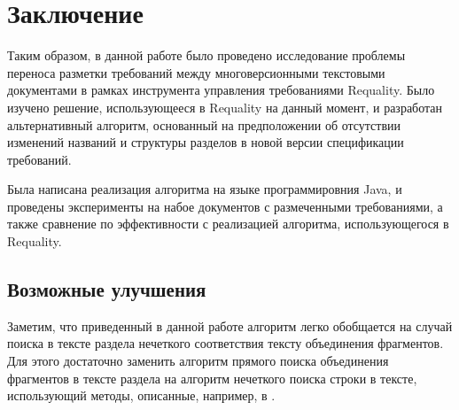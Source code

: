 \section{Заключение}
\label{sec:Chapter6} 

Таким образом, в данной работе было проведено исследование проблемы переноса разметки требований между многоверсионными текстовыми документами в рамках инструмента управления требованиями Requality. Было изучено решение, использующееся в Requality на данный момент, и разработан альтернативный алгоритм, основанный на предположении об отсутствии изменений названий и структуры разделов в новой версии спецификации требований.

Была написана реализация алгоритма на языке программировния Java, и проведены эксперименты на набое документов с размеченными требованиями, а также сравнение по эффективности с реализацией алгоритма, использующегося в Requality.

\subsection{Возможные улучшения}

Заметим, что приведенный в данной работе алгоритм легко обобщается на случай поиска в тексте раздела нечеткого соответствия тексту объединения фрагментов. Для этого достаточно заменить алгоритм прямого поиска объединения фрагментов в тексте раздела на алгоритм нечеткого поиска строки в тексте, использующий методы, описанные, например, в \cite{web:StrNotExact}.